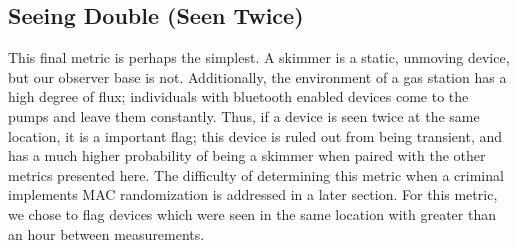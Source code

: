 \subsection{Seeing Double (Seen Twice)}

This final metric is perhaps the simplest. A skimmer is a static, unmoving device, but our
observer base is not. Additionally, the environment of a gas station has a high degree of flux;
individuals with bluetooth enabled devices come to the pumps and leave them constantly. Thus,
if a device is seen twice at the same location, it is a important flag; this device is ruled out
from being transient, and has a much higher probability of being a skimmer when paired with the
other metrics presented here. The difficulty of determining this metric when a criminal
implements MAC randomization is addressed in a later section. For this metric, we chose to flag
devices which were seen in the same location with greater than an hour between measurements.

